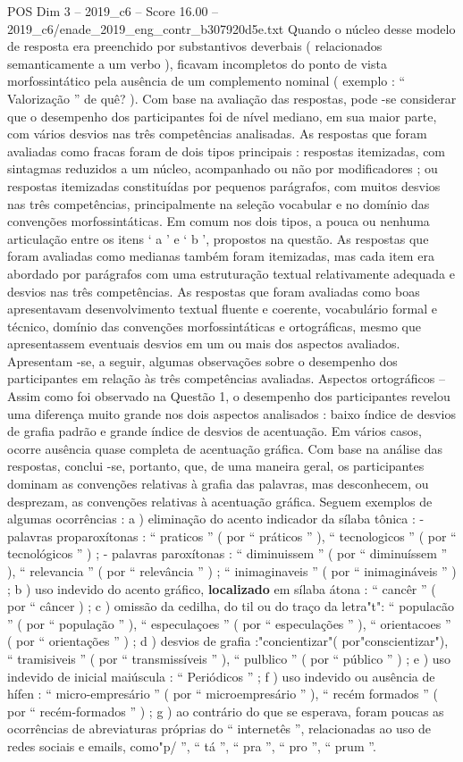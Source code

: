\begin{textsample}{POS Dim 3 – 2019\_c6 – Score 16.00 – 2019\_c6/enade\_2019\_eng\_contr\_b307920d5e.txt}
Quando o núcleo desse modelo de resposta era preenchido por substantivos deverbais ( relacionados semanticamente a um verbo ), ficavam incompletos do ponto de vista morfossintático pela ausência de um complemento nominal ( exemplo : “ Valorização ” de quê? ).
Com base na avaliação das respostas, pode -se considerar que o desempenho dos participantes foi de nível mediano, em sua maior parte, com vários desvios nas três competências analisadas.
As respostas que foram avaliadas como fracas foram de dois tipos principais : respostas itemizadas, com sintagmas reduzidos a um núcleo, acompanhado ou não por modificadores ; ou respostas itemizadas constituídas por pequenos parágrafos, com muitos desvios nas três competências, principalmente na seleção vocabular e no domínio das convenções morfossintáticas.
Em comum nos dois tipos, a pouca ou nenhuma articulação entre os itens ‘ a ’ e ‘ b ’, propostos na questão.
As respostas que foram avaliadas como medianas também foram itemizadas, mas cada item era abordado por parágrafos com uma estruturação textual relativamente adequada e desvios nas três competências.
As respostas que foram avaliadas como boas apresentavam desenvolvimento textual fluente e coerente, vocabulário formal e técnico, domínio das convenções morfossintáticas e ortográficas, mesmo que apresentassem eventuais desvios em um ou mais dos aspectos avaliados.
Apresentam -se, a seguir, algumas observações sobre o desempenho dos participantes em relação às três competências avaliadas.
Aspectos ortográficos – Assim como foi observado na Questão 1, o desempenho dos participantes revelou uma diferença muito grande nos dois aspectos analisados : baixo índice de desvios de grafia padrão e grande índice de desvios de acentuação.
Em vários casos, ocorre ausência quase completa de acentuação gráfica.
Com base na análise das respostas, conclui -se, portanto, que, de uma maneira geral, os participantes dominam as convenções relativas à grafia das palavras, mas desconhecem, ou desprezam, as convenções relativas à acentuação gráfica.
Seguem exemplos de algumas ocorrências : a ) eliminação do acento indicador da sílaba tônica : - palavras proparoxítonas : “ praticos ” ( por “ práticos ” ), “ tecnologicos ” ( por “ tecnológicos ” ) ; - palavras paroxítonas : “ diminuissem ” ( por “ diminuíssem ” ), “ relevancia ” ( por “ relevância ” ) ; “ inimaginaveis ” ( por “ inimagináveis ” ) ; b ) uso indevido do acento gráfico, \textbf{localizado} em sílaba átona : “ cancêr ” ( por “ câncer ) ; c ) omissão da cedilha, do til ou do traço da letra"t": “ populacão ” ( por “ população ” ), “ especulaçoes ” ( por “ especulações ” ), “ orientacoes ” ( por “ orientações ” ) ; d ) desvios de grafia :"concientizar"( por"conscientizar"), “ tramisiveis ” ( por “ transmissíveis ” ), “ pulblico ” ( por “ público ” ) ; e ) uso indevido de inicial maiúscula : “ Periódicos ” ; f ) uso indevido ou ausência de hífen : “ micro-empresário ” ( por “ microempresário ” ), “ recém formados ” ( por “ recém-formados ” ) ; g ) ao contrário do que se esperava, foram poucas as ocorrências de abreviaturas próprias do “ internetês ”, relacionadas ao uso de redes sociais e emails, como"p/ ”, “ tá ”, “ pra ”, “ pro ”, “ prum ”.

\end{textsample}
